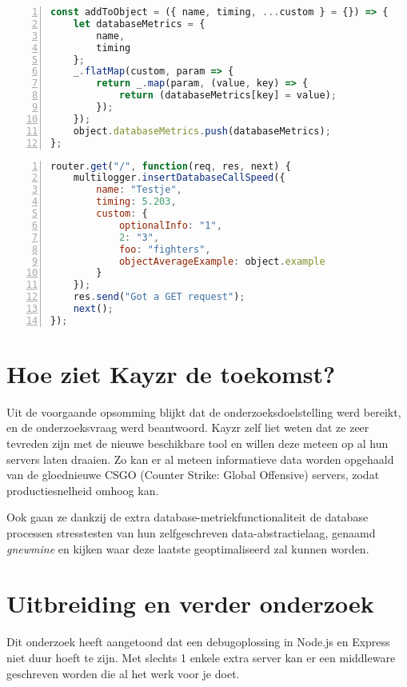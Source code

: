 \begin{lstlisting}[language=JavaScript, breaklines=true, numbers=left, frame=single, caption={Extra informatie wordt doorgestuurd naar InfluxDB},label=code:addToObject]
const addToObject = ({ name, timing, ...custom } = {}) => {
	let databaseMetrics = {
		name,
		timing
	};
	_.flatMap(custom, param => {
		return _.map(param, (value, key) => {
			return (databaseMetrics[key] = value);
		});
	});
	object.databaseMetrics.push(databaseMetrics);
};
\end{lstlisting}
\begin{lstlisting}[language=JavaScript, breaklines=true, numbers=left, frame=single, caption={Deze functie kan overal in de API worden opgeroepen},label=code:plugin]
router.get("/", function(req, res, next) {
	multilogger.insertDatabaseCallSpeed({
		name: "Testje",
		timing: 5.203,
		custom: {
			optionalInfo: "1",
			2: "3",
			foo: "fighters",
			objectAverageExample: object.example
		}
	});
	res.send("Got a GET request");
	next();
});
\end{lstlisting}


\section{Hoe ziet Kayzr de toekomst?}
\label{sec:future}

Uit de voorgaande opsomming blijkt dat de onderzoeksdoelstelling werd bereikt, en de onderzoeksvraag werd beantwoord. Kayzr zelf liet weten dat ze zeer tevreden zijn met de nieuwe beschikbare tool en willen deze meteen op al hun servers laten draaien. Zo kan er al meteen informatieve data worden opgehaald van de gloednieuwe CSGO (Counter Strike: Global Offensive) servers, zodat productiesnelheid omhoog kan.

Ook gaan ze dankzij de extra database-metriekfunctionaliteit de database processen stresstesten van hun zelfgeschreven data-abstractielaag, genaamd \textit{gnewmine} en kijken waar deze laatste geoptimaliseerd zal kunnen worden.

\section{Uitbreiding en verder onderzoek}
\label{sec:expansin}

Dit onderzoek heeft aangetoond dat een debugoplossing in Node.js en Express niet duur hoeft te zijn. Met slechts 1 enkele extra server kan er een middleware geschreven worden die al het werk voor je doet. 

